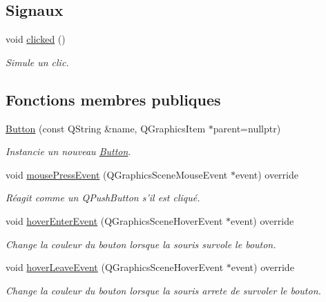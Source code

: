 \subsection*{Signaux}
\begin{DoxyCompactItemize}
\item 
\hypertarget{classButton_a9e7ab4152cb1e7e3beb7f2842f32670c}{void \hyperlink{classButton_a9e7ab4152cb1e7e3beb7f2842f32670c}{clicked} ()}\label{classButton_a9e7ab4152cb1e7e3beb7f2842f32670c}

\begin{DoxyCompactList}\small\item\em Simule un clic. \end{DoxyCompactList}\end{DoxyCompactItemize}
\subsection*{Fonctions membres publiques}
\begin{DoxyCompactItemize}
\item 
\hyperlink{classButton_a113121202ebc033f44ec1af8a02e32b1}{Button} (const Q\+String \&name, Q\+Graphics\+Item $\ast$parent=nullptr)
\begin{DoxyCompactList}\small\item\em Instancie un nouveau \hyperlink{classButton}{Button}. \end{DoxyCompactList}\item 
void \hyperlink{classButton_ae1f0efa6300488997798eba96fd36d6b}{mouse\+Press\+Event} (Q\+Graphics\+Scene\+Mouse\+Event $\ast$event) override
\begin{DoxyCompactList}\small\item\em Réagit comme un Q\+Push\+Button s’il est cliqué. \end{DoxyCompactList}\item 
void \hyperlink{classButton_ac33d59fdbee27d4bbe45461d211f4314}{hover\+Enter\+Event} (Q\+Graphics\+Scene\+Hover\+Event $\ast$event) override
\begin{DoxyCompactList}\small\item\em Change la couleur du bouton lorsque la souris survole le bouton. \end{DoxyCompactList}\item 
void \hyperlink{classButton_a573d972bbb0eae7ccda37d1ea8918d84}{hover\+Leave\+Event} (Q\+Graphics\+Scene\+Hover\+Event $\ast$event) override
\begin{DoxyCompactList}\small\item\em Change la couleur du bouton lorsque la souris arrete de survoler le bouton. \end{DoxyCompactList}\end{DoxyCompactItemize}



